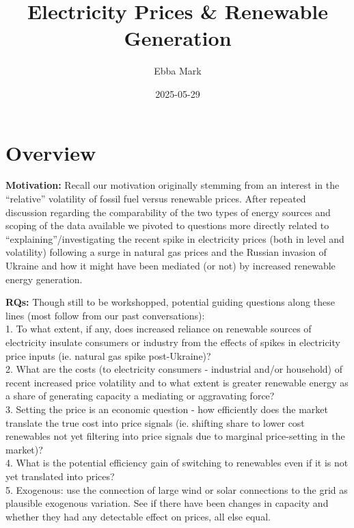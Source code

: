 \documentclass[
]{article}
\title{Electricity Prices \& Renewable Generation}
\author{Ebba Mark}
\date{2025-05-29}
\begin{document}
\maketitle

\section{Overview}\label{overview}

\textbf{Motivation:} Recall our motivation originally stemming from an
interest in the ``relative'' volatility of fossil fuel versus renewable
prices. After repeated discussion regarding the comparability of the two
types of energy sources and scoping of the data available we pivoted to
questions more directly related to ``explaining''/investigating the
recent spike in electricity prices (both in level and volatility)
following a surge in natural gas prices and the Russian invasion of
Ukraine and how it might have been mediated (or not) by increased
renewable energy generation.

\textbf{RQs:} Though still to be workshopped, potential guiding
questions along these lines (most follow from our past conversations):\\
1. To what extent, if any, does increased reliance on renewable sources
of electricity insulate consumers or industry from the effects of spikes
in electricity price inputs (ie. natural gas spike post-Ukraine)?\\
2. What are the costs (to electricity consumers - industrial and/or
household) of recent increased price volatility and to what extent is
greater renewable energy as a share of generating capacity a mediating
or aggravating force?\\
3. Setting the price is an economic question - how efficiently does the
market translate the true cost into price signals (ie. shifting share to
lower cost renewables not yet filtering into price signals due to
marginal price-setting in the market)?\\
4. What is the potential efficiency gain of switching to renewables even
if it is not yet translated into prices?\\
5. Exogenous: use the connection of large wind or solar connections to
the grid as plausible exogenous variation. See if there have been
changes in capacity and whether they had any detectable effect on
prices, all else equal.
\end{document}

